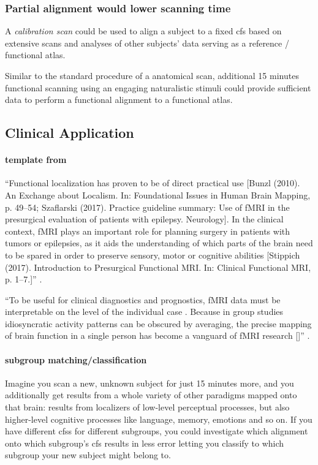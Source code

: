 \subsubsection{Partial alignment would lower scanning time}
%
A \textit{calibration scan} could be used to align a subject to a fixed \ac{cfs}
based on extensive scans and analyses of other subjects' data serving as a
reference / functional atlas.

%
Similar to the standard procedure of a anatomical scan, additional 15 minutes
functional scanning using an engaging naturalistic stimuli  could provide
sufficient data to perform a functional alignment to a functional atlas.


\subsection{Clinical Application}


\paragraph{template from \citet{wegrzyn2018thought}}

``Functional localization has proven to be of direct practical use [Bunzl
(2010). An Exchange about Localism. In: Foundational Issues in Human Brain
Mapping, p. 49–54; Szaflarski (2017). Practice guideline summary: Use of fMRI in
the presurgical evaluation of patients with epilepsy. Neurology].
%
In the clinical context, fMRI plays an important role for planning surgery in
patients with tumors or epilepsies, as it aids the understanding of which parts
of the brain need to be spared in order to preserve sensory, motor or cognitive
abilities [Stippich (2017). Introduction to Presurgical Functional MRI. In:
Clinical Functional MRI, p. 1–7.]'' \citep{wegrzyn2018thought}.

``To be useful for clinical diagnostics and prognostics, fMRI data must be
interpretable on the level of the individual case \citep{dubois2016building}.
%
Because in group studies idiosyncratic activity patterns can be obscured by
averaging, the precise mapping of brain function in a single person has become a
vanguard of fMRI research [\citet{laumann2015functional, huth2016natural,
gordon2017precision}]'' \citep{wegrzyn2018thought}.


\paragraph{subgroup matching/classification}
%
Imagine you scan a new, unknown subject for just 15 minutes more, and you
additionally get results from a whole variety of other paradigms mapped onto
that brain: results from localizers of low-level perceptual processes, but also
higher-level cognitive processes like language, memory, emotions and so on.
%
If you have different \acp{cfs} for different subgroups, you could investigate
which alignment onto which subgroup's \ac{cfs} results in less
error letting you classify to which subgroup your new subject might belong to.


